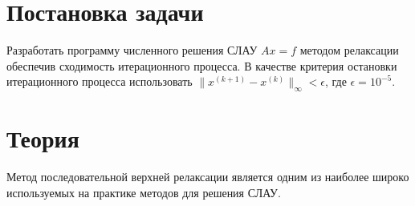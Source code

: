 \documentclass[12pt, a4paper]{report}
\begin{document}
\begin{titlepage}
\end{titlepage}

\tableofcontents


\section{Постановка задачи}

Разработать программу численного решения СЛАУ $Ax = f$ методом релаксации обеспечив сходимость итерационного процесса. В качестве критерия остановки итерационного процесса использовать $\|x^{(k+1)} - x^{(k)}\|_\infty < \epsilon$, где $\epsilon = 10^{-5}$.

\section{Теория}

Метод последовательной верхней релаксации является одним из наиболее
широко используемых на практике методов для решения СЛАУ.
\end{document}
